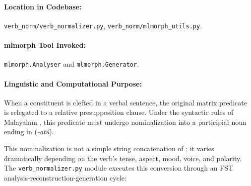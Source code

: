 \paragraph{Location in Codebase:} \texttt{verb\_norm/verb\_normalizer.py}, \texttt{verb\_norm/mlmorph\_utils.py}.
\paragraph{mlmorph Tool Invoked:} \texttt{mlmorph.Analyser} and \texttt{mlmorph.Generator}.

\paragraph{Linguistic and Computational Purpose:}
When a constituent is clefted in a verbal sentence, the original matrix predicate is relegated to a relative presupposition clause. Under the syntactic rules of Malayalam \citep{moag2002malayalam}, this predicate must undergo nominalization into a participial noun ending in  (\textit{-atŭ}). 

This nominalization is not a simple string concatenation of ; it varies dramatically depending on the verb's tense, aspect, mood, voice, and polarity. The \texttt{verb\_normalizer.py} module executes this conversion through an FST analysis-reconstruction-generation cycle:

